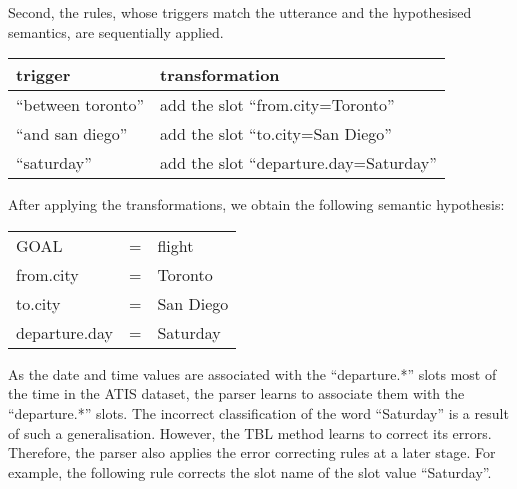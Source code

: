 \documentclass{article}
\begin{document}
Second, the rules, whose triggers match the utterance and the hypothesised semantics, are sequentially applied. 

\vspace{.15cm}
\begin{tabular}{ll}
  trigger & transformation \\
  \hline 
  ``between toronto''     & add the slot ``from.city=Toronto'' \\
  ``and san diego''       & add the slot ``to.city=San Diego'' \\
  ``saturday''            & add the slot ``departure.day=Saturday'' \\
\end{tabular} 
\vspace{.15cm}

After applying the transformations, we obtain the following semantic hypothesis: 

\vspace{.15cm}
\begin{tabular}{lll}
  GOAL          & = & flight \\
  from.city     & = & Toronto \\
  to.city       & = & San Diego \\
  departure.day & = & Saturday \\
\end{tabular} 
\vspace{.15cm}



As the date and time values are associated with the ``departure.*'' slots most of the time in the ATIS dataset,  
the parser learns to associate them with the ``departure.*'' slots. The incorrect classification of the word ``Saturday'' is a result of such a generalisation. 
However, the TBL method learns to correct its errors. Therefore, the parser also applies the error correcting rules at a later stage. For example, the following rule corrects the slot name of the slot value ``Saturday''.
\end{document}
